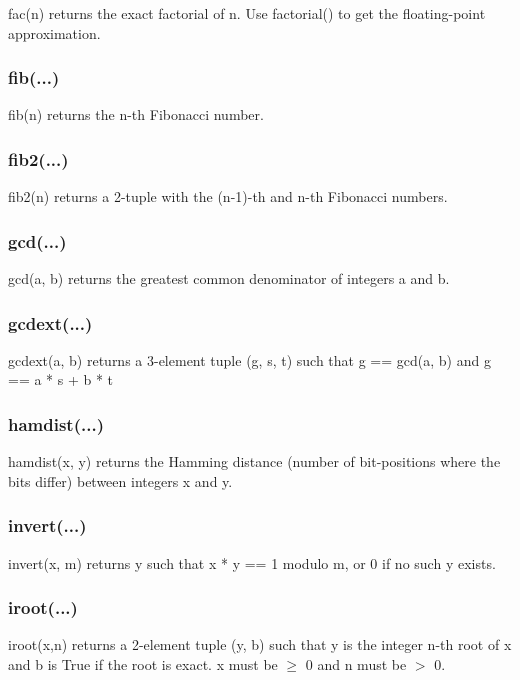 fac(n) returns the exact factorial of n. Use factorial() to get the floating-point approximation.

\subsubsection{fib(...)}

fib(n) returns the n-th Fibonacci number.

\subsubsection{fib2(...)}

fib2(n) returns a 2-tuple with the (n-1)-th and n-th Fibonacci numbers.

\subsubsection{gcd(...)}

gcd(a, b) returns the greatest common denominator of integers a and b.

\subsubsection{gcdext(...)}

gcdext(a, b) returns a 3-element tuple (g, s, t) such that
g == gcd(a, b) and g == a * s + b * t

\subsubsection{hamdist(...)}

hamdist(x, y) returns the Hamming distance (number of bit-positions where the bits differ)
between integers x and y.

\subsubsection{invert(...)}

invert(x, m) returns y such that x * y == 1 modulo m, or 0 if no such y exists.

\subsubsection{iroot(...)}

iroot(x,n) returns a 2-element tuple (y, b) such that y is the integer n-th root of x and b is True if
the root is exact. x must be $\ge$ 0 and n must be $>$ 0.

